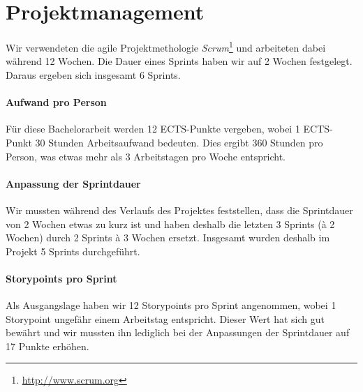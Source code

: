 \chapter{Projektmanagement}
\label{projektmanagement}

Wir verwendeten die agile Projektmethologie \emph{Scrum}\footnote{\url{http://www.scrum.org}} und arbeiteten dabei während 12 Wochen.
Die Dauer eines Sprints haben wir auf 2 Wochen festgelegt. Daraus ergeben sich insgesamt 6 Sprints.

\subsubsection{Aufwand pro Person}
Für diese Bachelorarbeit werden 12 ECTS-Punkte vergeben, wobei 1 ECTS-Punkt 30 Stunden Arbeitsaufwand bedeuten.
Dies ergibt 360 Stunden pro Person, was etwas mehr als 3 Arbeitstagen pro Woche entspricht.

\subsubsection{Anpassung der Sprintdauer}
Wir mussten während des Verlaufs des Projektes feststellen, dass die Sprintdauer von 2 Wochen etwas zu kurz ist und haben deshalb die letzten 3 Sprints (à 2 Wochen) durch 2 Sprints à 3 Wochen ersetzt. Insgesamt wurden deshalb im Projekt 5 Sprints durchgeführt. 

\subsubsection{Storypoints pro Sprint}
Als Ausgangslage haben wir 12 Storypoints pro Sprint angenommen, wobei 1 Storypoint ungefähr einem Arbeitstag entspricht. 
Dieser Wert hat sich gut bewährt und wir mussten ihn lediglich bei der Anpassungen der Sprintdauer auf 17 Punkte erhöhen.





